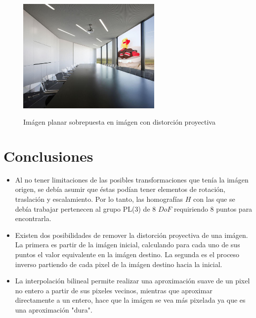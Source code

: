 \documentclass{IEEEtran}
\begin{document}
\begin{figure}[H]
\caption{Imágen planar sobrepuesta en imágen con distorción proyectiva}
\centering
\includegraphics[width=7cm,natwidth=1000,natheight=796]{imgs/p2fImg.jpg}
\label{fig:p2fImg}
\end{figure} 

\section{Conclusiones}
\begin{itemize}
\item Al no tener limitaciones de las posibles transformaciones que
tenía la imágen origen, se debía asumir que éstas podían tener
elementos de rotación, traslación y escalamiento. Por lo tanto, 
las homografías $H$ con las que se debía trabajar pertenecen al grupo
PL(3) de 8 $DoF$ requiriendo 8 puntos para encontrarla.

\item Existen dos posibilidades de remover la distorción proyectiva
de una imágen. La primera es partir de la imágen inicial, calculando para cada
uno de sus puntos el valor equivalente en la imágen destino. La segunda
es el proceso inverso partiendo de cada pixel de la imágen destino hacia la
inicial.

\item La interpolación bilineal permite realizar una aproximación suave de un
pixel no entero a partir de sus pixeles vecinos, mientras que aproximar directamente
a un entero, hace que la imágen se vea más pixelada ya que es una aproximación "dura".
\end{itemize} 



\end{document}
